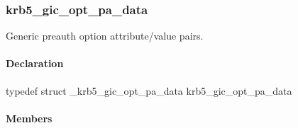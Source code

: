 \documentclass[letterpaper,10pt,english]{sphinxmanual}
\begin{document}

\begin{fulllineitems}
\label{appdev/refs/types/krb5_get_init_creds_opt:c.krb5_get_init_creds_opt.salt}
\end{fulllineitems}



\subsubsection{krb5\_gic\_opt\_pa\_data}
\label{appdev/refs/types/krb5_gic_opt_pa_data::doc}\label{appdev/refs/types/krb5_gic_opt_pa_data:krb5-gic-opt-pa-data}\label{appdev/refs/types/krb5_gic_opt_pa_data:krb5-gic-opt-pa-data-struct}

\begin{fulllineitems}
\label{appdev/refs/types/krb5_gic_opt_pa_data:c.krb5_gic_opt_pa_data}
\end{fulllineitems}


Generic preauth option attribute/value pairs.


\paragraph{Declaration}
\label{appdev/refs/types/krb5_gic_opt_pa_data:declaration}
typedef struct \_krb5\_gic\_opt\_pa\_data  krb5\_gic\_opt\_pa\_data


\paragraph{Members}
\label{appdev/refs/types/krb5_gic_opt_pa_data:members}

\begin{fulllineitems}
\label{appdev/refs/types/krb5_gic_opt_pa_data:c.krb5_gic_opt_pa_data.attr}
\end{fulllineitems}


\begin{fulllineitems}
\label{appdev/refs/types/krb5_gic_opt_pa_data:c.krb5_gic_opt_pa_data.value}
\end{fulllineitems}
\end{document}
